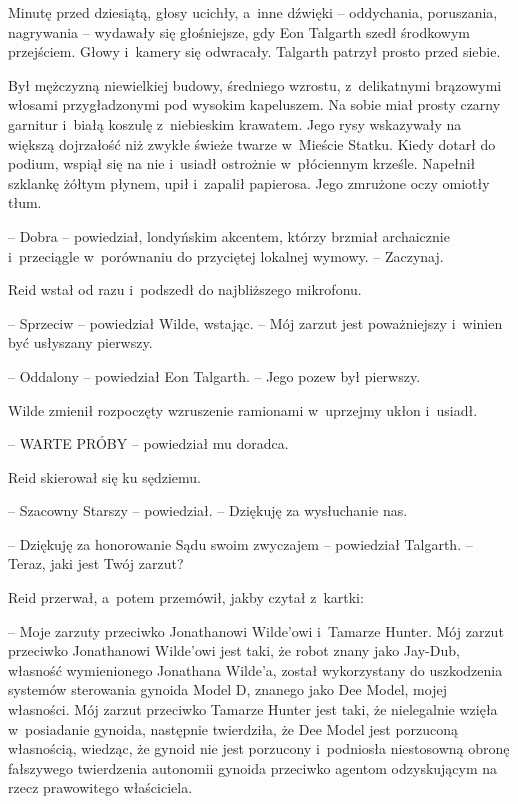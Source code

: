 \documentclass[oneside,polish,11pt,sfheadings]{mwbk}
\begin{document}
Minutę przed dziesiątą, głosy ucichły, a~inne dźwięki -- oddychania,
poruszania, nagrywania -- wydawały się głośniejsze, gdy Eon Talgarth
szedł środkowym przejściem. Głowy i~kamery się odwracały. Talgarth
patrzył prosto przed siebie.

Był mężczyzną niewielkiej budowy, średniego wzrostu, z~delikatnymi
brązowymi włosami przygładzonymi pod wysokim kapeluszem. Na sobie miał
prosty czarny garnitur i~białą koszulę z~niebieskim krawatem. Jego rysy
wskazywały na większą dojrzałość niż zwykłe świeże twarze w~Mieście
Statku. Kiedy dotarł do podium, wspiął się na nie i~usiadł ostrożnie w~płóciennym krześle. Napełnił szklankę żółtym płynem, upił i~zapalił
papierosa. Jego zmrużone oczy omiotły tłum.

-- Dobra -- powiedział, londyńskim akcentem, którzy brzmiał archaicznie i~przeciągle w~porównaniu do przyciętej lokalnej wymowy. -- Zaczynaj.

Reid wstał od razu i~podszedł do najbliższego mikrofonu.

-- Sprzeciw -- powiedział Wilde, wstając. -- Mój zarzut jest poważniejszy i~winien być usłyszany pierwszy.

-- Oddalony -- powiedział Eon Talgarth. -- Jego pozew był pierwszy.

Wilde zmienił rozpoczęty wzruszenie ramionami w~uprzejmy ukłon i~usiadł.

-- WARTE PRÓBY -- powiedział mu doradca.

Reid skierował się ku sędziemu.

-- Szacowny Starszy -- powiedział. -- Dziękuję za wysłuchanie nas.

-- Dziękuję za honorowanie Sądu swoim zwyczajem -- powiedział Talgarth. -- Teraz, jaki jest Twój zarzut?

Reid przerwał, a~potem przemówił, jakby czytał z~kartki: 

-- Moje zarzuty
przeciwko Jonathanowi Wilde'owi i~Tamarze Hunter. Mój zarzut przeciwko
Jonathanowi Wilde'owi jest taki, że robot znany jako Jay-Dub, własność
wymienionego Jonathana Wilde'a, został wykorzystany do uszkodzenia
systemów sterowania gynoida Model D, znanego jako Dee Model, mojej
własności. Mój zarzut przeciwko Tamarze Hunter jest taki, że nielegalnie
wzięła w~posiadanie gynoida, następnie twierdziła, że Dee Model jest
porzuconą własnością, wiedząc, że gynoid nie jest porzucony i~podniosła
niestosowną obronę fałszywego twierdzenia autonomii gynoida przeciwko
agentom odzyskującym na rzecz prawowitego właściciela.
\end{document}
